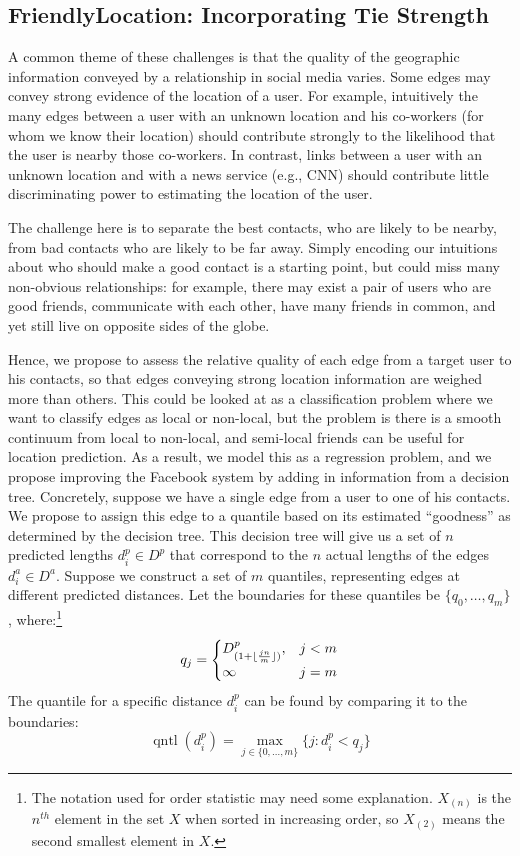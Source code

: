 \documentclass[letterpaper]{article}
\DeclareMathOperator{\quantile}{qntl}
\begin{document}
\subsection{FriendlyLocation: Incorporating Tie Strength}
A common theme of these challenges is that the quality of the geographic
information conveyed by a relationship in social media varies.
%
Some edges may convey strong evidence of the location of a user.
%
For example, intuitively the many edges between a user with an unknown location
and his co-workers (for whom we know their location) should contribute strongly
to the likelihood that the user is nearby those co-workers.
%
In contrast, links between a user with an unknown location and with a news
service (e.g., CNN) should contribute little discriminating power to estimating
the location of the user.

The challenge here is to separate the best contacts, who are likely to be
nearby, from bad contacts who are likely to be far away.
%
Simply encoding our intuitions about who should make a good contact is a
starting point, but could miss many non-obvious relationships: for example,
there may exist a pair of users who are good friends, communicate with each
other, have many friends in common, and yet still live on opposite sides of the
globe.
%


Hence, we propose to assess the relative quality of each edge from a target
user to his contacts, so that edges conveying strong location information are
weighed more than others.
%
This could be looked at as a classification problem where we want to classify
edges as local or non-local, but the problem is there is a smooth continuum
from local to non-local, and semi-local friends can be useful for location
prediction.
%
As a result, we model this as a regression problem, and we propose improving
the Facebook system by adding in information from a decision tree.
%
Concretely, suppose we have a single edge from a user to one of his contacts.
We propose to assign this edge to a quantile based on its estimated
``goodness'' as determined by the decision tree.
%
This decision tree will give us a set of $n$ predicted lengths $d^p_i \in D^p$
that correspond to the $n$ actual lengths of the edges $d^a_i \in D^a$.
%
Suppose we construct a set of $m$ quantiles, representing edges at different
predicted distances.
%
Let the boundaries for these quantiles be $\{q_0,\dots,q_m\}$,
where:\footnote{The notation used for order statistic may need some
    explanation.  $X_{(n)}$ is the $n^{th}$ element in the set $X$ when sorted
    in increasing order, so $X_{(2)}$ means the second smallest element in
$X$.}
\[
    q_j =
    \begin{cases}
        D^p_{(1+\lfloor {jn\over m} \rfloor)}, & j<m \\
        \infty & j=m
    \end{cases}
\]
\noindent The quantile for a specific distance $d^p_i$ can be found by comparing it to the boundaries:
\[
    \quantile(d^p_i) = \max_{j \in \{0,\dots,m\}} \{j: d^p_i<q_j\}
\]
\end{document}
